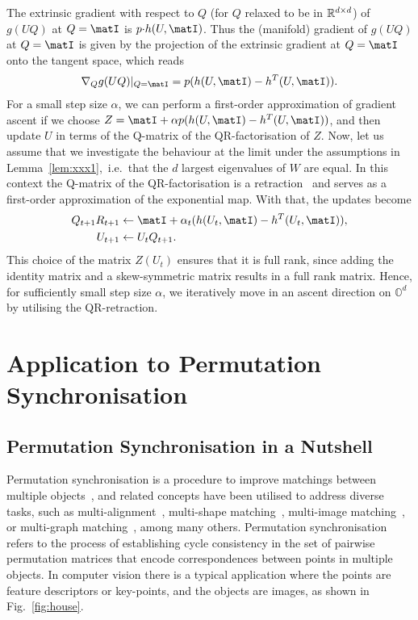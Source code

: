 \documentclass{article}
\begin{document}
%
%
%
%
The extrinsic gradient with respect to $Q$ (for $Q$ relaxed to be in $\mathbb{R}^{d \times d}$) of $g(UQ)$ at $Q = \matI$ is $ p{\cdot}h(U,\matI)$. 
Thus the (manifold) gradient of $g(UQ)$ at $Q = \matI$ is given by the projection of the extrinsic gradient at $Q = \matI$ onto the tangent space, which reads
\begin{align}
    \nabla_Q g(UQ)|_{Q = \matI} = p(h(U,\matI) - h^T(U,\matI)).
\end{align} 
For a small step size $\alpha$, we can perform a first-order approximation of gradient ascent if we choose $Z = \matI + \alpha p(h(U,\matI) - h^T(U,\matI))$, and then update $U$ in terms of the Q-matrix of the QR-factorisation of $Z$. 
Now, let us assume that we investigate the behaviour at the limit under the assumptions in Lemma~\ref{lem:xxx1},~i.e.~that the $d$ largest eigenvalues of $W$ are equal. In this context the Q-matrix of the QR-factorisation is a retraction~\cite{absil2009optimization} 
and serves as a first-order approximation of the exponential map. 
%
%
With that, the updates become
\begin{align}
    Q_{t+1}R_{t+1} &\gets \matI + \alpha_t (h(U_t,\matI) - h^T(U_t,\matI)),\label{eq:mangradasc}\\
     U_{t+1} &\gets U_t Q_{t+1}.
\end{align}
%
%
This choice of the matrix $Z(U_t)$ ensures that it is full rank, since adding the identity matrix and a skew-symmetric matrix results in a full rank matrix. Hence, for sufficiently small step size $\alpha$, we iteratively move in an ascent direction on $\mathbb{O}^d$ by utilising the QR-retraction.


\section{Application to Permutation Synchronisation}\label{sec:permsync}
\subsection{Permutation Synchronisation in a Nutshell} Permutation synchronisation is a procedure to improve matchings between multiple objects~\cite{Huang:2013uk,Pachauri:2013wx}, and related concepts have been utilised to address diverse tasks, such as multi-alignment~\cite{bernard2015solution,arrigoni2016spectral,huang2019learning}, multi-shape matching~\cite{huang2019tensor,huang2020consistent,gao2021isometric}, multi-image matching~\cite{zhou2015multi,tron2017fast,bernard2019hippi,birdal2019probabilistic,birdal2021quantum}, or multi-graph matching~\cite{yan2016short,bernard:2018,swoboda2019convex}, among many others. Permutation synchronisation refers to the process of establishing cycle consistency in the set of pairwise permutation matrices that encode correspondences between points in multiple objects. In computer vision there is a typical application where the points are feature descriptors or key-points, and the objects are images, as shown in Fig.~\ref{fig:house}. 
\end{document}
